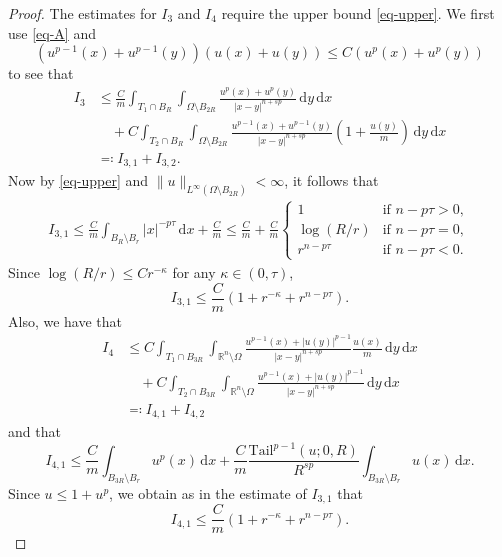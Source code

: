 \documentclass[11pt]{amsart}
\theoremstyle{plain}
\theoremstyle{definition}
\numberwithin{equation}{section}
\begin{document}
\begin{proof}
The estimates for $I_3$ and $I_4$ require the upper bound \eqref{eq-upper}. We first use \eqref{eq-A} and
\begin{equation*}
(u^{p-1}(x)+u^{p-1}(y))(u(x)+u(y)) \leq C(u^p(x)+u^p(y))
\end{equation*}
to see that
	\begin{equation*}
		\begin{aligned}
			I_3
			&\leq \frac{C}{m} \int_{T_1 \cap B_R} \int_{\Omega \setminus B_{2R}} \frac{u^p(x)+u^p(y)}{|x-y|^{n+sp}} \,\mathrm{d}y\,\mathrm{d}x\\
			&\quad+C\int_{T_2 \cap  B_R} \int_{\Omega \setminus B_{2R}} \frac{u^{p-1}(x)+u^{p-1}(y)}{|x-y|^{n+sp}}\left(1+\frac{u(y)}{m} \right)\,\mathrm{d}y\,\mathrm{d}x\\
			&\eqqcolon I_{3, 1}+I_{3, 2}.
		\end{aligned}
	\end{equation*}
Now by \eqref{eq-upper} and $\|u\|_{L^\infty(\Omega \setminus B_{2R})} < \infty$, it follows that
	\begin{equation*}
		\begin{aligned}
			I_{3, 1} \leq \frac{C}{m} \int_{B_R \setminus B_r} |x|^{-p\tau} \,\mathrm{d}x+\frac{C}{m} \leq \frac{C}{m} + \frac{C}{m}
			\begin{cases}
				1 &\text{if }n-p\tau > 0, \\
				\log (R/r) &\text{if } n-p\tau =0, \\
				r^{n-p\tau} &\text{if } n-p\tau<0.
			\end{cases}
		\end{aligned}
	\end{equation*}
Since $\log(R/r) \leq Cr^{-\kappa}$ for any $\kappa \in (0, \tau)$,
\begin{equation*}
I_{3, 1} \leq \frac{C}{m} \left( 1+r^{-\kappa}+r^{n-p\tau} \right).
\end{equation*}
Also, we have that
	\begin{align*}
			I_4
			&\leq C\int_{T_1 \cap B_{3R}} \int_{\mathbb{R}^n \setminus \Omega} \frac{u^{p-1}(x)+|u(y)|^{p-1}}{|x-y|^{n+sp}} \frac{u(x)}{m} \,\mathrm{d}y\,\mathrm{d}x\\
			&\quad+C\int_{T_2 \cap B_{3R}} \int_{\mathbb{R}^n \setminus \Omega} \frac{u^{p-1}(x)+|u(y)|^{p-1}}{|x-y|^{n+sp}}\,\mathrm{d}y\,\mathrm{d}x\\
			&\eqqcolon I_{4, 1}+I_{4, 2}
	\end{align*}
and that
	\begin{equation*}
			I_{4, 1} \leq \frac{C}{m} \int_{B_{3R} \setminus B_r} u^{p}(x)\,\mathrm{d}x+\frac{C}{m} \frac{\mathrm{Tail}^{p-1}(u; 0, R)}{R^{sp}} \int_{B_{3R} \setminus B_r} u(x) \,\mathrm{d}x.
	\end{equation*}
	Since $u \leq 1+u^p$, we obtain as in the estimate of $I_{3, 1}$ that
\begin{equation*}
I_{4, 1} \leq \frac{C}{m} \left( 1+r^{-\kappa}+r^{n-p\tau} \right).
\end{equation*}
	

\end{proof}
\end{document}
